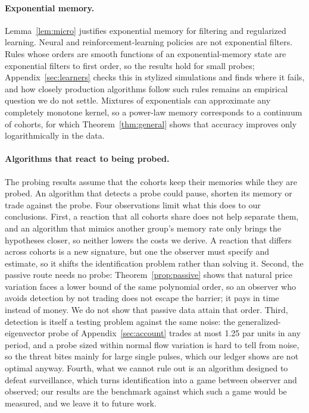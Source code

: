 \documentclass[12pt]{article}
\theoremstyle{definition}
\theoremstyle{remark}
\begin{document}
\paragraph{Exponential memory.} Lemma~\ref{lem:micro} justifies exponential memory for filtering and regularized learning. Neural and reinforcement-learning policies are not exponential filters. Rules whose orders are smooth functions of an exponential-memory state are exponential filters to first order, so the results hold for small probes; Appendix~\ref{sec:learners} checks this in stylized simulations and finds where it fails, and how closely production algorithms follow such rules remains an empirical question we do not settle. Mixtures of exponentials can approximate any completely monotone kernel, so a power-law memory corresponds to a continuum of cohorts, for which Theorem~\ref{thm:general} shows that accuracy improves only logarithmically in the data.

\paragraph{Algorithms that react to being probed.} The probing results assume that the cohorts keep their memories while they are probed. An algorithm that detects a probe could pause, shorten its memory or trade against the probe. Four observations limit what this does to our conclusions. First, a reaction that all cohorts share does not help separate them, and an algorithm that mimics another group's memory rate only brings the hypotheses closer, so neither lowers the costs we derive. A reaction that differs across cohorts is a new signature, but one the observer must specify and estimate, so it shifts the identification problem rather than solving it. Second, the passive route needs no probe: Theorem~\ref{prop:passive} shows that natural price variation faces a lower bound of the same polynomial order, so an observer who avoids detection by not trading does not escape the barrier; it pays in time instead of money. We do not show that passive data attain that order. Third, detection is itself a testing problem against the same noise: the generalized-eigenvector probe of Appendix~\ref{sec:account} trades at most 1.25 par units in any period, and a probe sized within normal flow variation is hard to tell from noise, so the threat bites mainly for large single pulses, which our ledger shows are not optimal anyway. Fourth, what we cannot rule out is an algorithm designed to defeat surveillance, which turns identification into a game between observer and observed; our results are the benchmark against which such a game would be measured, and we leave it to future work.
\end{document}
